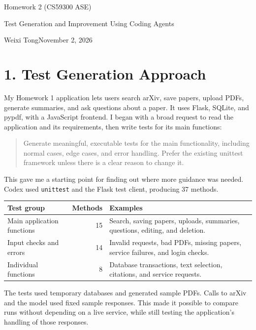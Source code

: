 \documentclass[10pt,letterpaper]{article}
\newcommand{\reportsection}[1]{\section*{\color{black}#1}}
\begin{document}
\color{black}
{\Large Homework 2 (CS59300 ASE)\par}
\vspace{5pt}
{\huge Test Generation and Improvement Using Coding Agents\par}
\vspace{10pt}
{\normalsize Weixi Tong\hfill November 2, 2026\par}
\vspace{12pt}


\reportsection{1. Test Generation Approach}

My Homework 1 application lets users search arXiv, save papers, upload PDFs, generate summaries, and ask questions about a paper. It uses Flask, SQLite, and pypdf, with a JavaScript frontend. I began with a broad request to read the application and its requirements, then write tests for its main functions:
\begin{quote}
\small
Generate meaningful, executable tests for the main functionality, including normal cases, edge cases, and error handling. Prefer the existing unittest framework unless there is a clear reason to change it.
\end{quote}

This gave me a starting point for finding out where more guidance was needed. Codex used \texttt{unittest} and the Flask test client, producing 37 methods.

\begin{center}
\small
\renewcommand{\arraystretch}{1.15}
\begin{tabularx}{\linewidth}{@{}l r Y@{}}
\toprule
Test group & Methods & Examples \\
\midrule
Main application functions & 15 & Search, saving papers, uploads, summaries, questions, editing, and deletion. \\
Input checks and errors & 14 & Invalid requests, bad PDFs, missing papers, service failures, and login checks. \\
Individual functions & 8 & Database transactions, text selection, citations, and service requests. \\
\bottomrule
\end{tabularx}
\end{center}

The tests used temporary databases and generated sample PDFs. Calls to arXiv and the model used fixed sample responses. This made it possible to compare runs without depending on a live service, while still testing the application's handling of those responses.
\end{document}
